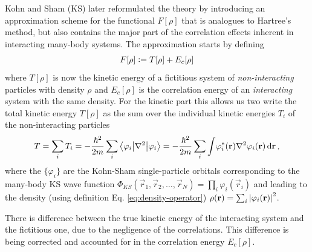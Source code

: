 		Kohn and Sham (KS) later reformulated\citep{Kohn1965} the theory by introducing an approximation scheme for the functional $F[\rho]$ that is analogues to Hartree's method, but also contains the major part of the correlation effects inherent in interacting many-body systems. The approximation starts by defining
		\begin{align}
			F[\rho] \vcentcolon= T[\rho] + E_{c}[\rho]
		\end{align}
		where $T[\rho]$ is now the kinetic energy of a fictitious system of \emph{non-interacting} particles with density $\rho$ and $E_c[\rho]$ is the correlation energy of an \emph{interacting} system with the same density. For the kinetic part this allows us two write the total kinetic energy $T[\rho]$ as the sum over the individual kinetic energies $T_i$ of the non-interacting particles
		\begin{align}
			T = \sum_i T_i = -\frac{\hbar^2}{2m} \sum_i \ev**{\laplacian}{\varphi_i} = -\frac{\hbar^2}{2m} \sum_i \int\! \varphi_i^*({\mathbf r})\laplacian \varphi_i({\mathbf r})\diff{r}\,, \label{eq:kin-energy}
		\end{align}
		where the $\{\varphi_i\}$ are the Kohn-Sham single-particle orbitals corresponding to the many-body KS wave function $\Phi_{KS}(\vec{r}_1,\vec{r}_2,\ldots,\vec{r}_N)=\prod_i\varphi_i(\vec{r}_i)$ and leading to the density (using definition Eq. \ref{eq:density-operator}) $\rho(\vec{r})=\sum_i\absolutevalue{\varphi_i(\vec{r})}^2$.
	
		There is difference between the true kinetic energy of the interacting system and the fictitious one, due to the negligence of the correlations. This difference is being corrected and accounted for in the correlation energy $E_c[\rho]$.\\
		
